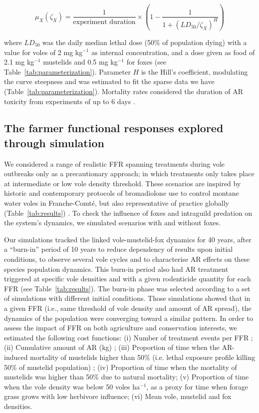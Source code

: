 \documentclass[11pt]{article}
\begin{document}
\begin{equation}
\mu_X(\zeta_X) = \dfrac{1}{\text{experiment duration}} \times \left( 1- \dfrac{1}{1+ (LD_{50}/\zeta_X)^H} \right) 
\label{eq:muX}
\end{equation}

where $LD_{50}$ was the daily median lethal dose (50\% of population dying) with a value for voles of 2 mg kg$^{-1}$ as internal concentration, and a dose given as food of  2.1 mg kg$^{-1}$ mustelids \citep{Grolleau1989} and 0.5 mg kg$^{-1}$ for foxes \citep{Sage2010} (see Table~\ref{tab:parameterization}). Parameter $H$ is the Hill's coefficient, modulating the curve steepness and was estimated to fit the sparse data we have (Table~\ref{tab:parameterization}). Mortality rates considered the duration of AR toxicity from experiments of up to 6 days \citep{Sage2010}.

\subsection{The farmer functional responses explored through simulation}

We considered a range of realistic FFR spanning treatments during vole outbreaks only as a precautionary approach; in which treatments only takes place at intermediate or low vole density threshold. These scenarios are inspired by historic and contemporary protocols of bromadiolone use to control montane water voles in Franche-Comté, but also representative of practice globally (Table~\ref{tab:results}) \citep{Delattre2009}. To check the influence of foxes and intraguild predation on the system’s dynamics, we simulated scenarios with and without foxes.

Our simulations tracked the linked vole-mustelid-fox dynamics for 40 years, after a “burn-in” period of 10 years to reduce dependency of results upon initial conditions, to observe several vole cycles and to characterise AR effects on these species population dynamics. This burn-in period also had AR treatment triggered at specific vole densities and with a given rodenticide quantity for each FFR (see Table~\ref{tab:results}). The burn-in phase was selected according to a set of simulations with different initial conditions. Those simulations showed that in a given FFR (i.e., same threshold of vole density and amount of AR spread), the dynamics of the population were converging toward a similar pattern. 
In order to assess the impact of FFR on both agriculture and conservation interests, we estimated the following cost functions: (i) Number of treatment events per FFR ; (ii) Cumulative amount of AR (kg) ; (iii) Proportion of time when the AR-induced mortality of mustelids higher than 50\% (i.e. lethal exposure profile killing 50\% of mustelid population) ; (iv) Proportion of time when the mortality of mustelids was higher than 50\% due to natural mortality; (v) Proportion of time when the vole density was below 50 voles ha$^{-1}$, as a proxy for time when forage grass grows with low herbivore influence; (vi) Mean vole, mustelid and fox densities.
\end{document}
